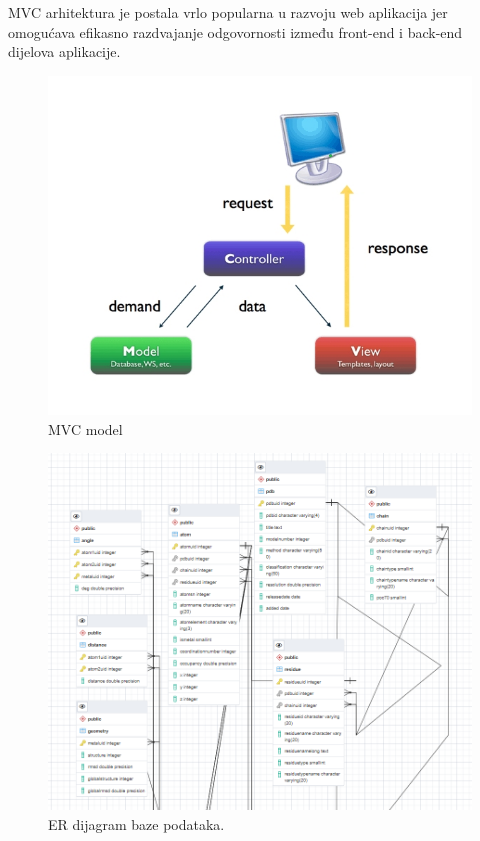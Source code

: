 \documentclass[times, utf8, zavrsni]{fer}
\begin{document}
MVC arhitektura je postala vrlo popularna u razvoju web aplikacija jer omogućava efikasno razdvajanje odgovornosti između front-end i back-end dijelova aplikacije. 


  \begin{figure}[!htb]
	\centering
	\hspace*{-2.5cm}
	 \includegraphics[width=\dimexpr\paperwidth-10cm,height=\dimexpr\paperheight-15cm,keepaspectratio]
	{./img/mvc.jpg}
		\centering
                      \caption{MVC model}
    \end{figure}


   \begin{figure}[!htb]
	\centering
	\hspace*{-2.5cm}
	 \includegraphics[width=\dimexpr\paperwidth-2cm,height=\paperheight,keepaspectratio]
	{./img/ERdijagram.png}
		\centering
                      \caption{ER dijagram baze podataka.}
    \end{figure}
\end{document}
